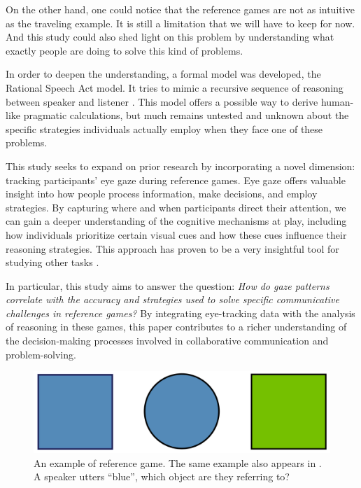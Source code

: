 On the other hand, one could notice that the reference games are not as intuitive as the traveling example. It is still a limitation that we will have to keep for now. And this study could also shed light on this problem by understanding what exactly people are doing to solve this kind of problems.

In order to deepen the understanding, a formal model was developed, the Rational Speech Act model. It tries to mimic a recursive sequence of reasoning between speaker and listener \citep{Franke_2016}. This model offers a possible way to derive human-like pragmatic calculations, but much remains untested and unknown about the specific strategies individuals actually employ when they face one of these problems.

This study seeks to expand on prior research by incorporating a novel dimension: tracking participants' eye gaze during reference games. Eye gaze offers valuable insight into how people process information, make decisions, and employ strategies. By capturing where and when participants direct their attention, we can gain a deeper understanding of the cognitive mechanisms at play, including how individuals prioritize certain visual cues and how these cues influence their reasoning strategies. This approach has proven to be a very insightful tool for studying other tasks \citep{Vigneau_2006}.

In particular, this study aims to answer the question: \textit{How do gaze patterns correlate with the accuracy and strategies used to solve specific communicative challenges in reference games?} By integrating eye-tracking data with the analysis of reasoning in these games, this paper contributes to a richer understanding of the decision-making processes involved in collaborative communication and problem-solving.

\begin{figure}
    \centering
    \includegraphics[width=0.6\linewidth]{images/intro_complex.png}
    \caption{An example of reference game. The same example also appears in \cite{Frank_2012}. A speaker utters ``blue'', which object are they referring to?}
    \label{fig:intro_complex}
\end{figure}